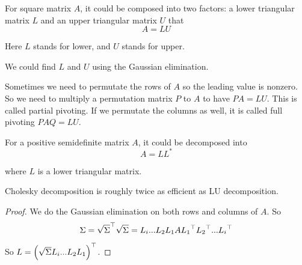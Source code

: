 \begin{theorem}[LU Decomposition]
    For square matrix $A$, it could be composed into two factors: a lower triangular matrix $L$ and an upper triangular matrix $U$ that
    \begin{equation}
        A = LU
    \end{equation}
    
    Here $L$ stands for lower, and $U$ stands for upper.
    
    We could find $L$ and $U$ using the Gaussian elimination.
    
    Sometimes we need to permutate the rows of $A$ so the leading value is nonzero. So we need to multiply a permutation matrix $P$ to $A$ to have $PA = LU$. This is called partial pivoting. If we permutate the columns as well, it is called full pivoting $PAQ = LU$.
\end{theorem}

\begin{theorem}
    For a positive semidefinite matrix $A$, it could be decomposed into 
    \begin{equation}
        A = L L^*
    \end{equation}
    
    where $L$ is a lower triangular matrix.
    
    Cholesky decomposition is roughly twice as efficient as LU decomposition.
\end{theorem}
\begin{proof}
    We do the Gaussian elimination on both rows and columns of $A$. So 
    \begin{equation}
        \Sigma = {\sqrt{\Sigma}}^\top \sqrt{\Sigma} = L_i ... L_2 L_1 A {L_1}^\top {L_2}^\top ... {L_i}^\top
    \end{equation}
    
    So $L = {\left(\sqrt{\Sigma}L_i ... L_2 L_1\right)}^\top$.
\end{proof}

























